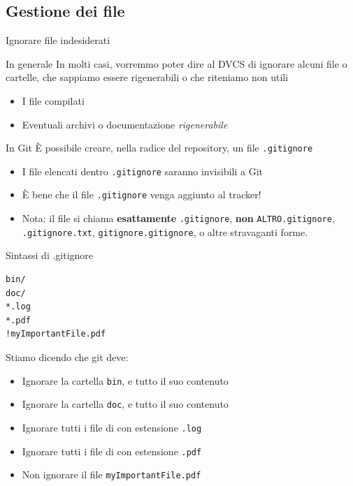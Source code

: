 \documentclass[xcolor=dvipsnames,presentation]{beamer}
\begin{document}
\subsection{Gestione dei file}

\begin{frame}{Ignorare file indesiderati}
    \begin{block}{In generale}
        In molti casi, vorremmo poter dire al DVCS di ignorare alcuni file o cartelle, che sappiamo
essere rigenerabili o che riteniamo non utili
        \begin{itemize}
            \item I file compilati
            \item Eventuali archivi o documentazione \textit{rigenerabile}
        \end{itemize}
    \end{block}
    \begin{block}{In Git}
        È possibile creare, nella radice del repository, un file \texttt{.gitignore}
        \begin{itemize}
            \item I file elencati dentro \texttt{.gitignore} saranno invisibili a Git
            \item È bene che il file \texttt{.gitignore} venga aggiunto al tracker!
            \item Nota: il file si chiama \textbf{esattamente} \texttt{.gitignore}, \textbf{non}
\texttt{ALTRO.gitignore}, \texttt{.gitignore.txt}, \texttt{gitignore.gitignore}, o altre stravaganti
forme.
        \end{itemize}
    \end{block}
    \begin{block}{Sintassi di .gitignore}
        \begin{Verbatim}[fontsize=\scriptsize]
bin/
doc/
*.log
*.pdf
!myImportantFile.pdf
        \end{Verbatim}
        Stiamo dicendo che git deve:
        \begin{itemize}
            \item Ignorare la cartella \texttt{bin}, e tutto il suo contenuto
            \item Ignorare la cartella \texttt{doc}, e tutto il suo contenuto
            \item Ignorare tutti i file di con estensione \texttt{.log}
            \item Ignorare tutti i file di con estensione \texttt{.pdf}
            \item Non ignorare il file \texttt{myImportantFile.pdf}

\end{itemize}
\end{block}
\end{frame}
\end{document}
